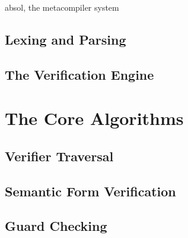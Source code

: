 \gls{absol}, the metacompiler system 

\subsection{Lexing and Parsing} %
\label{sub:lexing_and_parsing}


\subsection{The Verification Engine} %
\label{sub:the_verification_engine}



\section{The Core Algorithms} %
\label{sec:the_core_algorithms}

\subsection{Verifier Traversal} %
\label{sub:verifier_traversal}


\subsection{Semantic Form Verification} %
\label{sub:semantic_form_verification}


\subsection{Guard Checking} %
\label{sub:guard_checking}


